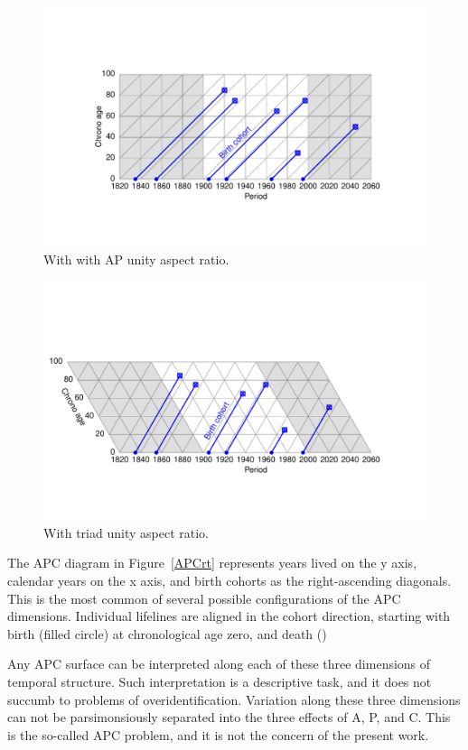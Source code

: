 \documentclass[11pt,oneside,a4paper]{article} %
\begin{document}
\begin{figure} 
\centering
    \caption{With with AP unity aspect ratio.} 
    \label{fig:APCrt} 
    \includegraphics[scale=.6]{Figures/LabPres/APC4.pdf}
\end{figure}

\begin{figure}
    \centering
    \caption{With triad unity aspect ratio.} 
    \label{fig:APCeq} 
    \includegraphics[scale=.6]{Figures/LabPres/APC5.pdf}
\end{figure}

The APC diagram in Figure~\ref{APCrt} represents years lived on the y axis,
calendar years on the x axis, and birth cohorts as the right-ascending
diagonals. This is the most common of several possible configurations
of the APC dimensions. Individual lifelines are aligned in the cohort direction,
starting with birth (filled circle) at chronological age zero, and death ()

Any APC surface can be interpreted along each of these
three dimensions of temporal structure. Such interpretation is a descriptive
task, and it does not succumb to problems of overidentification. Variation along
these three dimensions can not be parsimonsiously separated into the three
effects of A, P, and C. This is the so-called APC problem, and it is not the concern of the
present work. 
\end{document}
